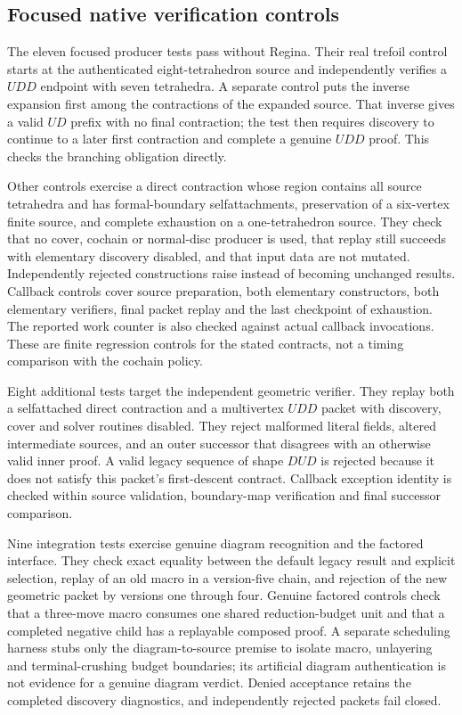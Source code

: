 \subsection{Focused native verification controls}

The eleven focused producer tests pass without Regina.  Their real
trefoil control starts at the authenticated eight-tetrahedron source
and independently verifies a $UDD$ endpoint with seven tetrahedra.
A separate control puts the inverse expansion first among the
contractions of the expanded source.  That inverse gives a valid $UD$
prefix with no final contraction; the test then requires discovery to
continue to a later first contraction and complete a genuine $UDD$
proof.  This checks the branching obligation directly.

Other controls exercise a direct contraction whose region contains all
source tetrahedra and has formal-boundary selfattachments, preservation
of a six-vertex finite source, and complete exhaustion on a one-tetrahedron
source.  They check that no cover, cochain or normal-disc producer is
used, that replay still succeeds with elementary discovery disabled,
and that input data are not mutated.  Independently rejected constructions
raise instead of becoming unchanged results.  Callback controls cover
source preparation, both elementary constructors, both elementary
verifiers, final packet replay and the last checkpoint of exhaustion.
The reported work counter is also checked against actual callback
invocations.  These are finite regression controls for the stated
contracts, not a timing comparison with the cochain policy.

Eight additional tests target the independent geometric verifier.
They replay both a selfattached direct contraction and a multivertex
$UDD$ packet with discovery, cover and solver routines disabled.
They reject malformed literal fields, altered intermediate sources,
and an outer successor that disagrees with an otherwise valid inner
proof.  A valid legacy sequence of shape $DUD$ is rejected because it
does not satisfy this packet's first-descent contract.  Callback
exception identity is checked within source validation, boundary-map
verification and final successor comparison.

Nine integration tests exercise genuine diagram recognition and the
factored interface.  They check exact equality between the default
legacy result and explicit  selection, replay of an old
macro in a version-five chain, and rejection of the new geometric
packet by versions one through four.  Genuine factored controls check
that a three-move macro consumes one shared reduction-budget unit and
that a completed negative child has a replayable composed proof.
A separate scheduling harness stubs only the diagram-to-source premise
to isolate macro, unlayering and terminal-crushing budget boundaries;
its artificial diagram authentication is not evidence for a genuine
diagram verdict.  Denied acceptance retains the completed discovery
diagnostics, and independently rejected packets fail closed.

